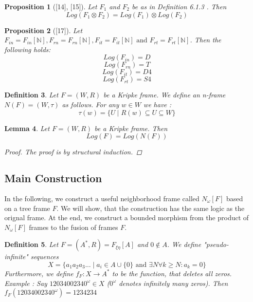 \documentclass[12pt, a4paper]{scrartcl}
\newtheorem{definition}{Definition}[subsection]
\newtheorem{lemma}[definition]{Lemma}
\newtheorem{proposition}[definition]{Proposition}
\begin{document}
\begin{proposition} [\textnormal{[14], [15]}]
    Let $F_1$ and $F_2$ be as in Definition 6.1.3 . Then 
    $$Log(F_1 \otimes F_2) = Log(F_1) \otimes Log(F_2)$$
\end{proposition}

\begin{proposition}[\textnormal{[17]}]
    Let $F_{in} = F_{in}[\mathbb{N}], F_{rn} = F_{rn}[\mathbb{N}], F_{it} = F_{it}[\mathbb{N}] \mbox{ and } F_{rt} = F_{rt}[\mathbb{N}]$. Then the following holds: \newline 
    $$ Log(F_{in}) = D$$
    $$ Log(F_{rn}) = T$$
    $$ Log(F_{it}) = D4$$
    $$ Log(F_{rt}) = S4$$

\end{proposition}

\begin{definition}
    Let $F = (W,R)$ be a Kripke frame. We define an n-frame $N(F) = (W, \tau)$ as follows.
    For any $w\in W$ we have :
    $$\tau(w) = \{ U \mid R(w) \subseteq U \subseteq W \}$$
        
\end{definition}

\begin{lemma}

    Let $F = (W,R)$ be a Kripke frame. Then $$Log(F) = Log(N(F))$$ 
    \begin{proof}
        The proof is by structural induction.
    \end{proof}
\end{lemma}


\subsection{Main Construction}
In the following, we construct a useful neighborhood frame called $N_\omega[F]$ based on a tree frame $F$.
We will show, that the construction has the same logic as the orignal frame. 
At the end, we construct a bounded morphism from the product of $N_\omega[F]$ frames to the fusion of frames $F$.


\begin{definition}
    Let $F = (A^*, R) = F_{\xi \eta}[A]$ and $0 \notin A$. We define "pseudo-infinite" sequences 
    $$X = \{a_1a_2a_3... \mid a_i \in A \cup \{0\} \mbox{ and } \exists N \forall k \geq N : a_k = 0\}$$
    Furthermore, we define $f_F : X \rightarrow A^*$ to be the function, that deletes all zeros. \newline \newline
    Example : Say $12034002340^\omega \in X$ ($0^\omega$ denotes infinitely many zeros). Then $f_F(12034002340^\omega) = 1234234$

\end{definition}
\end{document}
